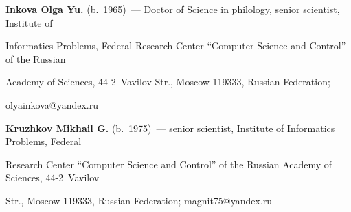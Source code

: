 \vspace*{-14pt}





\Contr





\vspace*{-3pt}








\noindent


\textbf{Inkova Olga Yu.} (b.\ 1965)~--- Doctor of Science  in philology, senior scientist, Institute of 


Informatics Problems, Federal Research Center ``Computer Science and Control'' of the Russian 


Academy of Sciences, 44-2~Vavilov Str., Moscow 119333, Russian Federation; 


\mbox{olyainkova@yandex.ru}








\vspace*{3pt}





\noindent


\textbf{Kruzhkov Mikhail G.} (b.\ 1975)~--- senior scientist, Institute of Informatics Problems, Federal 


Research Center ``Computer Science and Control'' of the Russian Academy of Sciences, 44-2~Vavilov 


Str., Moscow 119333, Russian Federation; \mbox{magnit75@yandex.ru}











\label{end\stat}





\renewcommand{\bibname}{\protect\rm Литература} 


      


  


